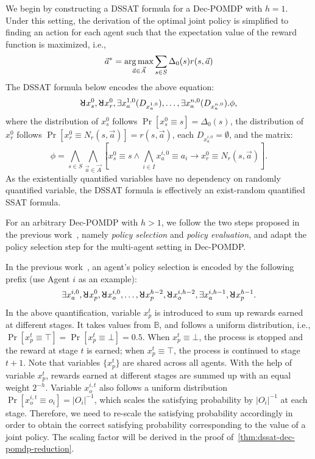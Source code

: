 We begin by constructing a DSSAT formula for a Dec-POMDP with $h=1$.
Under this setting, the derivation of the optimal joint policy is simplified to finding an action for each agent such that the expectation value of the reward function is maximized, i.e.,
\[
    \vec{a}^*=\operatorname*{arg\,max}_{\vec{a}\in \vec{A}}\sum_{s\in S}\Delta_0(s)r(s,\vec{a})
\]
The DSSAT formula below encodes the above equation:
\[
    \random{} x_s^0,\random{} x_r^0,\exists x_a^{1,0}(D_{x_a^{1,0}}),\ldots,\exists x_a^{n,0}(D_{x_a^{n,0}}).\phi,
\]
where the distribution of $x_s^0$ follows $\Pr[x_s^0 \equiv s]=\Delta_0(s)$, the distribution of $x_r^0$ follows $\Pr[x_r^0 \equiv N_r(s,\vec{a})]=r(s,\vec{a})$, each $D_{x_a^{i,0}}=\emptyset$, and the matrix:
\[
    \phi=\bigwedge_{s\in S}\bigwedge_{\vec{a}\in\vec{A}}[x_s^0\equiv s\wedge\bigwedge_{i\in I} x_a^{i,0}\equiv a_i\rightarrow x_r^0\equiv N_r(s,\vec{a})].
\]
As the existentially quantified variables have no dependency on randomly quantified variable, the DSSAT formula is effectively an exist-random quantified SSAT formula.

For an arbitrary Dec-POMDP with $h>1$, we follow the two steps proposed in the previous work~\cite{Salmon2020}, namely \textit{policy selection} and \textit{policy evaluation}, and adapt the policy selection step for the multi-agent setting in Dec-POMDP.

In the previous work~\cite{Salmon2020}, an agent's policy selection is encoded by the following prefix (use Agent $i$ as an example):
\[
    \exists x_a^{i,0},\random{} x_p^0,\random{} x_o^{i,0},\ldots,\random{} x_p^{h-2},\random{} x_o^{i,h-2},\exists x_a^{i,h-1},\random{} x_p^{h-1}.
\]
In the above quantification, variable $x_p^t$ is introduced to sum up rewards earned at different stages.
It takes values from $\mathbb{B}$, and follows a uniform distribution, i.e., $\Pr[x_p^t \equiv \top]=\Pr[x_p^t \equiv \bot]=0.5$.
When $x_p^t \equiv \bot$, the process is stopped and the reward at stage $t$ is earned; when $x_p^t \equiv \top$, the process is continued to stage $t+1$.
Note that variables $\{x_p^t\}$ are shared across all agents.
With the help of variable $x_p^t$, rewards earned at different stages are summed up with an equal weight $2^{-h}$.
Variable $x_o^{i,t}$ also follows a uniform distribution $\Pr[x_o^{i,t} \equiv o_i]=|O_i|^{-1}$, which scales the satisfying probability by $|O_i|^{-1}$ at each stage.
Therefore, we need to re-scale the satisfying probability accordingly in order to obtain the correct satisfying probability corresponding to the value of a joint policy.
The scaling factor will be derived in the proof of~\cref{thm:dssat-dec-pomdp-reduction}.

